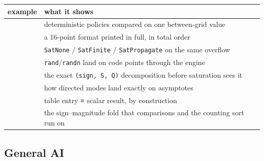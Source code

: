 \label{13551325986707881962}{}



\begin{table}[h]
\centering
\begin{tabulary}{\linewidth}{L L}
\toprule
example & what it shows \\
\toprule
{} & deterministic policies compared on one between-grid value \\
 & a 16-point format printed in full, in total order \\
 & \texttt{SatNone} / \texttt{SatFinite} / \texttt{SatPropagate} on the same overflow \\
 & \texttt{rand}/\allowbreak\texttt{randn} land on code points through the engine \\
 & the exact \texttt{(sign, S, Q)} decomposition before saturation sees it \\
 & how directed modes land exactly on asymptotes \\
 & table entry ≡ scalar result, by construction \\
 & the sign–magnitude fold that comparisons and the counting sort run on \\
\bottomrule
\end{tabulary}

\end{table}



\subsection{General AI}



\label{12995498770613901834}{}



